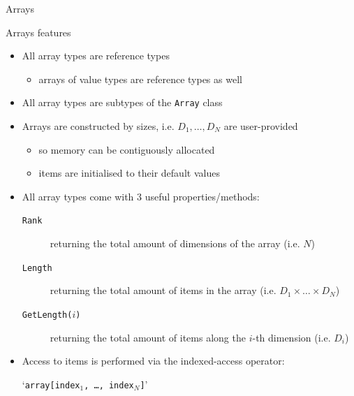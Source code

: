 \documentclass[presentation]{beamer}
\newcommand{\op}[1]{\alert{`\texttt{#1}'}}
\newcommand{\operand}[1][\ldots]{{\normalcolor#1}}
\begin{document}
\begin{frame}[shrink=5]{\dotnet Arrays}
    \begin{block}{Arrays features}
        \begin{itemize}
            \item All array types are \alert{reference} types
            \begin{itemize}
                \item arrays of value types are reference types as well
            \end{itemize}

            \item All array types are subtypes of the \texttt{Array} class

            \item Arrays are constructed by sizes, i.e. $D_1, \ldots, D_N$ are user-provided
            \begin{itemize}
                \item so memory can be contiguously allocated
                \item items are initialised to their default values
            \end{itemize}

            \item All array types come with 3 useful properties/methods:
            \begin{description}
                \item[\texttt{Rank}] returning the total amount of dimensions of the array (i.e. $N$)
                \item[\texttt{Length}] returning the total amount of items in the array (i.e. $D_1 \times \ldots \times D_N$)
                \item[\texttt{GetLength($i$)}] returning the total amount of items along the $i$-th dimension (i.e. $D_i$)
            \end{description}

            \item Access to items is performed via the indexed-access operator:
            \begin{center}
                \op{\operand[array][\operand[index$_1$, \ldots, index$_N$]]}  
            \end{center}
        \end{itemize}
    \end{block}
\end{frame} 
\end{document}
